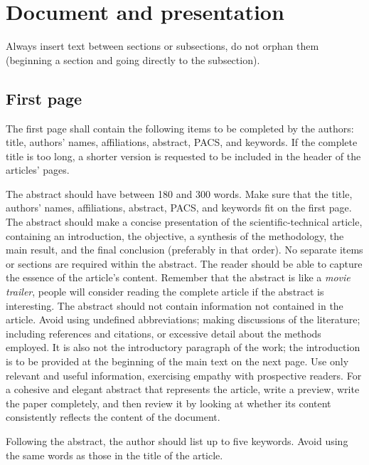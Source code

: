 \documentclass[12pt, a4paper, twoside, twocolumn]{article}
\begin{document}
\section{Document and presentation}

Always insert text between sections or subsections, do not orphan them (beginning a section and going directly to the subsection).

\subsection{First page}

The first page shall contain the following items to be completed by the authors: title, authors' names, affiliations, abstract, PACS, and keywords. If the complete title is too long, a shorter version is requested to be included in the header of the articles' pages.

The abstract should have between 180 and 300 words. Make sure that the title, authors' names, affiliations, abstract, PACS, and keywords fit on the first page. The abstract should make a concise presentation of the scientific-technical article, containing an introduction, the objective, a synthesis of the methodology, the main result, and the final conclusion (preferably in that order). No separate items or sections are required within the abstract. The reader should be able to capture the essence of the article's content. Remember that the abstract is like a \textit{movie trailer}, people will consider reading the complete article if the abstract is interesting. The abstract should not contain information not contained in the article. Avoid using undefined abbreviations; making discussions of the literature; including references and citations, or excessive detail about the methods employed. It is also not the introductory paragraph of the work; the introduction is to be provided at the beginning of the main text on the next page. Use only relevant and useful information, exercising empathy with prospective readers. For a cohesive and elegant abstract that represents the article, write a preview, write the paper completely, and then review it by looking at whether its content consistently reflects the content of the document.

Following the abstract, the author should list up to five keywords. Avoid using the same words as those in the title of the article.
\end{document}
